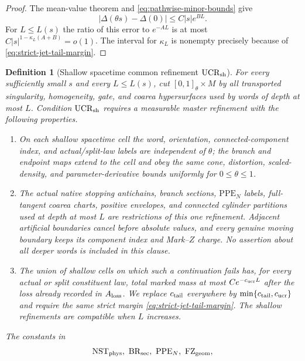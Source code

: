 \documentclass[11pt]{article}
\newtheorem{definition}[theorem]{Definition}
\begin{document}
\begin{proof}
The mean-value theorem and \eqref{eq:pathwise-minor-bounds} give
\[
 |\Delta(\theta s)-\Delta(0)|\le C|s|e^{BL}.
\]
For $L\le L(s)$ the ratio of this error to $e^{-AL}$ is at most
$C|s|^{1-\kappa_L(A+B)}=o(1)$.  The interval for $\kappa_L$ is nonempty precisely
because of \eqref{eq:strict-jet-tail-margin}.
\end{proof}

\begin{definition}[Shallow spacetime common refinement
$\mathrm{UCR}_{\rm sh}$]
\label{def:spacetime-common-refinement}
For every sufficiently small $s$ and every $L\le L(s)$, cut
$[0,1]_\theta\times M$ by all transported singularity, homogeneity, gate,
and coarea hypersurfaces used by words of depth at most $L$.  Condition
$\mathrm{UCR}_{\rm sh}$ requires a measurable master refinement with the
following properties.
\begin{enumerate}[label=\textup{(UCR\arabic*)}]
\item On each shallow spacetime cell the word, orientation,
      connected-component index, and actual/split-law labels are independent
      of $\theta$; the branch and endpoint maps extend to the cell and obey
      the same cone, distortion, scaled-density, and parameter-derivative
      bounds uniformly for $0\le\theta\le1$.
\item The actual native stopping antichains, branch sections,
      $\mathrm{PPE}_{N}$ labels, full-tangent
      coarea charts, positive envelopes, and connected cylinder partitions
      used at depth at most $L$ are restrictions of this one refinement.
      Adjacent artificial boundaries cancel before absolute values, and every
      genuine moving boundary keeps its component index and Mark--$Z$ charge.
      No assertion about all deeper words is included in this clause.
\item The union of shallow cells on which such a continuation fails has, for
      every actual or split constituent law, total marked mass at most
      $Ce^{-c_{\rm ucr}L}$ after the loss already recorded in
      $A_{\rm loss}$.  We replace $c_{\rm tail}$ everywhere by
      $\min\{c_{\rm tail},c_{\rm ucr}\}$ and require the same strict margin
      \eqref{eq:strict-jet-tail-margin}.  The shallow refinements are
      compatible when $L$ increases.
\end{enumerate}
The constants in
\[
 \begin{gathered}
 \mathrm{NST}_{\rm phys},\ \mathrm{BR}_{\rm sec},\ \mathrm{PPE}_{N},\
 \mathrm{FZ}_{\rm geom},\\

\end{gathered}\]
\end{definition}
\end{document}
